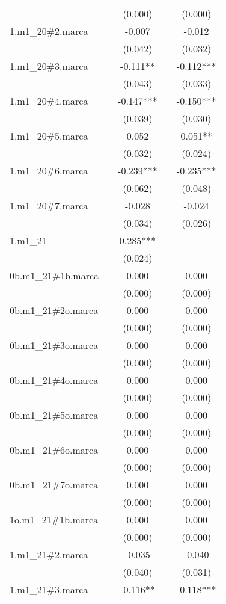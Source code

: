 \begin{tabular}{lcccc}
 &  & (0.000) &  & (0.000) \\
1.m1\_20\#2.marca &  & -0.007 &  & -0.012 \\
 &  & (0.042) &  & (0.032) \\
1.m1\_20\#3.marca &  & -0.111** &  & -0.112*** \\
 &  & (0.043) &  & (0.033) \\
1.m1\_20\#4.marca &  & -0.147*** &  & -0.150*** \\
 &  & (0.039) &  & (0.030) \\
1.m1\_20\#5.marca &  & 0.052 &  & 0.051** \\
 &  & (0.032) &  & (0.024) \\
1.m1\_20\#6.marca &  & -0.239*** &  & -0.235*** \\
 &  & (0.062) &  & (0.048) \\
1.m1\_20\#7.marca &  & -0.028 &  & -0.024 \\
 &  & (0.034) &  & (0.026) \\
1.m1\_21 &  & 0.285*** &  &  \\
 &  & (0.024) &  &  \\
0b.m1\_21\#1b.marca &  & 0.000 &  & 0.000 \\
 &  & (0.000) &  & (0.000) \\
0b.m1\_21\#2o.marca &  & 0.000 &  & 0.000 \\
 &  & (0.000) &  & (0.000) \\
0b.m1\_21\#3o.marca &  & 0.000 &  & 0.000 \\
 &  & (0.000) &  & (0.000) \\
0b.m1\_21\#4o.marca &  & 0.000 &  & 0.000 \\
 &  & (0.000) &  & (0.000) \\
0b.m1\_21\#5o.marca &  & 0.000 &  & 0.000 \\
 &  & (0.000) &  & (0.000) \\
0b.m1\_21\#6o.marca &  & 0.000 &  & 0.000 \\
 &  & (0.000) &  & (0.000) \\
0b.m1\_21\#7o.marca &  & 0.000 &  & 0.000 \\
 &  & (0.000) &  & (0.000) \\
1o.m1\_21\#1b.marca &  & 0.000 &  & 0.000 \\
 &  & (0.000) &  & (0.000) \\
1.m1\_21\#2.marca &  & -0.035 &  & -0.040 \\
 &  & (0.040) &  & (0.031) \\
1.m1\_21\#3.marca &  & -0.116** &  & -0.118*** \\

\end{tabular}
